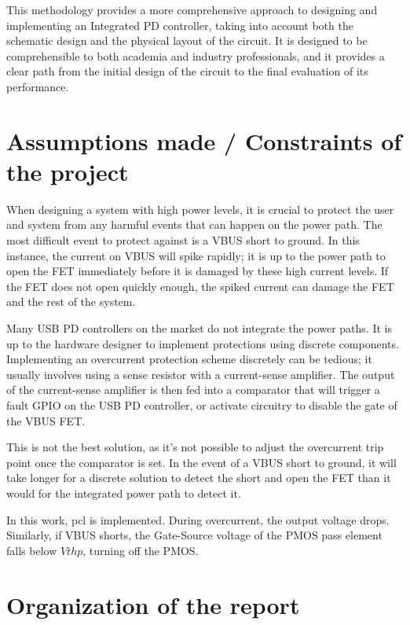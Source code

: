 This methodology provides a more comprehensive approach to designing and implementing an Integrated PD controller, taking into account both the schematic design and the physical layout of the circuit. It is designed to be comprehensible to both academia and industry professionals, and it provides a clear path from the initial design of the circuit to the final evaluation of its performance. 

\section[Assumptions made / Constraints of the project]{\textbf{Assumptions made / Constraints of the project}}

When designing a system with high power levels, it is crucial to protect the user and system from any harmful events that can happen on the power path. The most difficult event to protect against is a VBUS short to ground. In this instance, the current on VBUS will spike rapidly; it is up to the power path to open the FET immediately before it is damaged by these high current levels. If the FET does not open quickly enough, the spiked current can damage the FET and the rest of the system.

Many USB PD controllers on the market do not integrate the power paths. It is up to the hardware designer to implement protections using discrete components. 
 Implementing an overcurrent protection scheme discretely can be tedious; it usually involves using a sense resistor with a current-sense amplifier. The output of the current-sense amplifier is then fed into a comparator that will trigger a fault GPIO on the USB PD controller, or activate circuitry to disable the gate of the VBUS FET. 
 
This is not the best solution, as it’s not possible to adjust the overcurrent trip point once the comparator is set. In the event of a VBUS short to ground, it will take longer for a discrete solution to detect the short and open the FET than it would for the integrated power path to detect it.

In this work, \gls{pcl} is implemented. During overcurrent, the output voltage drops. Similarly, if VBUS shorts, the Gate-Source voltage of the PMOS pass element falls below \(Vthp\), turning off the PMOS.

\section[Organization of the report]{\textbf{Organization of the report}}


